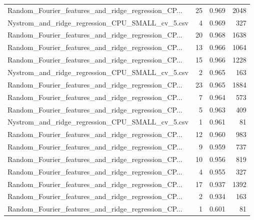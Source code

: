 \begin{tabularx}{\textwidth}{lrrr}
Random\_Fourier\_features\_and\_ridge\_regression\_CP... &       25 &               0.969 &          2048 \\
   Nystrom\_and\_ridge\_regression\_CPU\_SMALL\_cv\_5.csv &        4 &               0.969 &           327 \\
Random\_Fourier\_features\_and\_ridge\_regression\_CP... &       20 &               0.968 &          1638 \\
Random\_Fourier\_features\_and\_ridge\_regression\_CP... &       13 &               0.966 &          1064 \\
Random\_Fourier\_features\_and\_ridge\_regression\_CP... &       15 &               0.966 &          1228 \\
   Nystrom\_and\_ridge\_regression\_CPU\_SMALL\_cv\_5.csv &        2 &               0.965 &           163 \\
Random\_Fourier\_features\_and\_ridge\_regression\_CP... &       23 &               0.965 &          1884 \\
Random\_Fourier\_features\_and\_ridge\_regression\_CP... &        7 &               0.964 &           573 \\
Random\_Fourier\_features\_and\_ridge\_regression\_CP... &        5 &               0.963 &           409 \\
   Nystrom\_and\_ridge\_regression\_CPU\_SMALL\_cv\_5.csv &        1 &               0.961 &            81 \\
Random\_Fourier\_features\_and\_ridge\_regression\_CP... &       12 &               0.960 &           983 \\
Random\_Fourier\_features\_and\_ridge\_regression\_CP... &        9 &               0.959 &           737 \\
Random\_Fourier\_features\_and\_ridge\_regression\_CP... &       10 &               0.956 &           819 \\
Random\_Fourier\_features\_and\_ridge\_regression\_CP... &        4 &               0.955 &           327 \\
Random\_Fourier\_features\_and\_ridge\_regression\_CP... &       17 &               0.937 &          1392 \\
Random\_Fourier\_features\_and\_ridge\_regression\_CP... &        2 &               0.934 &           163 \\
Random\_Fourier\_features\_and\_ridge\_regression\_CP... &        1 &               0.601 &            81 \\
\bottomrule
\end{tabularx}
